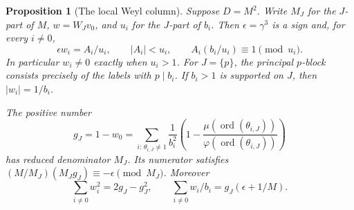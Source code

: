\documentclass[11pt]{amsart}
\numberwithin{equation}{section}
\newtheorem{proposition}[theorem]{Proposition}
\theoremstyle{definition}
\theoremstyle{plain}
\begin{document}
\begin{proposition}[The local Weyl column]\label{new:component-column}
Suppose $D=M^2$. Write $M_J$ for the $J$-part of $M$,
$w=W_Jv_0$, and $u_i$ for the $J$-part of $b_i$.
Then $\epsilon=\gamma^3$ is a sign and, for every $i\ne0$,
\[
 \epsilon w_i=A_i/u_i,\qquad |A_i|<u_i,\qquad
 A_i(b_i/u_i)\equiv1\pmod{u_i}.
\]
In particular $w_i\ne0$ exactly when $u_i>1$. For $J=\{p\}$,
the principal $p$-block consists precisely of the labels with
$p\mid b_i$. If $b_i>1$ is supported on $J$, then $|w_i|=1/b_i$.

The positive number
\[
 g_J=1-w_0=
 \sum_{i:\,\theta_{i,J}\ne1}
 \frac{1}{b_i^2}\left(1-
 \frac{\mu(\operatorname{ord}(\theta_{i,J}))}
      {\varphi(\operatorname{ord}(\theta_{i,J}))}\right)
\]
has reduced denominator $M_J$. Its numerator satisfies
$(M/M_J)(M_Jg_J)\equiv-\epsilon\pmod{M_J}$. Moreover
\begin{equation}\label{eq:component-norm}
 \sum_{i\ne0}w_i^2=2g_J-g_J^2,\qquad
 \sum_{i\ne0}w_i/b_i=g_J(\epsilon+1/M).
\end{equation}
\end{proposition}
\end{document}
